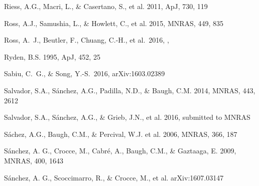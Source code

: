 \documentclass[iop]{emulateapj}
\begin{document}
\begin{thebibliography}{}
Riess, A.G., Macri, L., \& Casertano, S., et al. 2011, ApJ, 730, 119


Ross, A.J., Samushia, L., \& Howlett, C., et al. 2015, MNRAS, 449, 835

 Ross, A.~J., Beutler, F., Chuang, C.-H., et al.\ 2016, \mnras,  

Ryden, B.S. 1995, ApJ, 452, 25  



 Sabiu, C.~G., \& Song, Y.-S.\ 2016, arXiv:1603.02389 

Salvador, S.A., S\'{a}nchez, A.G., Padilla, N.D., \& Baugh, C.M. 2014, MNRAS, 443, 2612

Salvador, S.A., S\'{a}nchez, A.G., \& Grieb, J.N., et al. 2016, submitted to MNRAS

S\'{a}chez, A.G., Baugh, C.M., \& Percival, W.J. et al. 2006, MNRAS, 366, 187

S\'{a}nchez, A. G., Crocce, M., Cabr\'{e}, A., Baugh, C.M., \& Gaztaaga, E. 2009, MNRAS, 400, 1643

S\'{a}nchez, A. G., Scoccimarro, R., \& Crocce, M., et al.
arXiv:1607.03147







\end{thebibliography}
\end{document}
